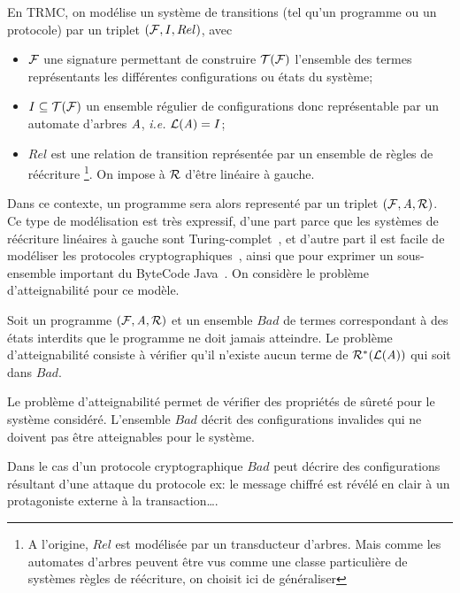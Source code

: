 En TRMC, on modélise un système de transitions (tel qu'un programme ou un protocole) par un triplet $(\mathcal{F}, I, Rel)$,
avec
\begin{itemize}
\item
$\mathcal{F}$ une signature permettant de construire $\mathcal{T(F)}$ l'ensemble des termes représentants les différentes configurations ou états
du système;

\item
  $I \subseteq \mathcal{T(F)}$ un ensemble régulier de configurations donc représentable par un automate d'arbres $\mathit A$, 
  \textit{i.e.} $\mathcal{L}(\mathit A)=I$;

\item $Rel$ est une relation de transition représentée par un ensemble de règles de réécriture
  \footnote{\footnotesize A l'origine, $Rel$ est modélisée par un transducteur d'arbres.
    Mais comme les automates d'arbres peuvent être vus comme une classe particulière de 
    systèmes règles de réécriture, on choisit ici de généraliser}.
  On impose à $\mathcal R$ d'être linéaire à gauche.
\end{itemize}

\noindent
Dans ce contexte, un programme sera alors representé par un triplet $(\mathcal{F},\mathit A,\mathcal R)$.
Ce type de modélisation est très expressif, d'une part parce que les systèmes de réécriture
linéaires à gauche sont Turing-complet~\cite{HUET-78}, et d'autre part il est facile de 
modéliser les protocoles cryptographiques~\cite{GenetK-CADE00}, ainsi que pour exprimer
un sous-ensemble important du ByteCode Java~\cite{BoichutGJL-RTA07}.
On considère le problème d'atteignabilité pour ce modèle.

\begin{definition}
\label{def:reachability}
Soit un programme $(\mathcal{F},\mathit A,\mathcal R)$ et un ensemble $Bad$ de termes correspondant à des états
interdits que le programme ne doit jamais atteindre.
Le problème d'atteignabilité consiste à vérifier qu'il n'existe 
aucun terme de $\mathcal R^*(\mathcal{L}(\mathit A))$ qui soit dans $Bad$.
\end{definition}

Le problème d'atteignabilité permet de vérifier des propriétés de sûreté
pour le système considéré. L'ensemble $Bad$ décrit des configurations invalides 
qui ne doivent pas être atteignables pour le système.

Dans le cas d'un protocole cryptographique $Bad$ peut décrire des
configurations résultant d'une attaque du protocole ex: le message
chiffré est révélé en clair à un protagoniste externe à la
transaction\dots.

